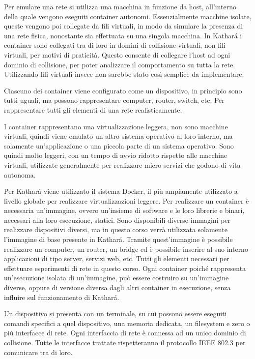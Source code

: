 \documentclass{article}
\numberwithin{equation}{subsection}
\begin{document}
Per emulare una rete si utilizza una macchina in funzione da host, all'interno della quale vengono eseguiti container autonomi. Essenzialmente macchine isolate, queste vengono poi collegate da fili virtuali, in 
modo da simulare la presenza di una rete fisica, nonostante sia effettuata su una singola macchina. 
In Kathar\'{a} i container sono collegati tra di loro in domini di collisione virtuali, non fili virtuali, per motivi di praticità. Questo consente di collegare l'host ad ogni dominio di collisione, per poter 
analizzare il comportamento su tutta la rete. Utilizzando fili virtuali invece non sarebbe stato così semplice da implementare. 

Ciascuno dei container viene configurato come un dispositivo, in principio sono tutti uguali, ma possono rappresentare computer, router, switch, etc. Per rappresentare tutti gli elementi di una rete realisticamente. 

I container rappresentano una virtualizzazione leggera, non sono macchine virtuali, quindi viene emulato un altro sistema operativo al loro interno, ma solamente un'applicazione o una piccola parte di un 
sistema operativo. Sono quindi molto leggeri, con un tempo di avvio ridotto rispetto alle macchine virtuali, utilizzate generalmente per realizzare micro-servizi che godono di vita autonoma. 


Per Kathar\'{a} viene utilizzato il sistema Docker, il più ampiamente utilizzato a livello globale per realizzare virtualizzazioni leggere. 
Per realizzare un container è necessaria un'immagine, ovvero un'insieme di software e le loro librerie e binari, necessari alla loro esecuzione, statici. Sono disponibili diverse immagini per realizzare dispositivi 
diversi, ma in questo corso verrà utilizzata solamente l'immagine di base presente in Kathar\'{a}. Tramite quest'immagine è possibile realizzare un computer, un router, un bridge ed è possibile inserire al suo 
interno applicazioni di tipo server, servizi web, etc. Tutti gli elementi necessari per effettuare esperimenti di rete in questo corso. Ogni container poiché rappresenta un'esecuzione isolata di un'immagine, può 
essere costruiro su un'immagine diverse, oppure di versione diversa dagli altri container in esecuzione, senza influire sul funzionamento di Kathar\'{a}. 

Un dispositivo si presenta con un terminale, su cui possono essere eseguiti comandi specifici a quel dispositivo, una memoria dedicata, un filesystem e zero o più interfacce di rete. Ogni interfaccia di rete è 
connessa ad un unico dominio di collisione. Tutte le interfacce trattate rispetteranno il protocollo IEEE 802.3 per comunicare tra di loro. 
\end{document}

